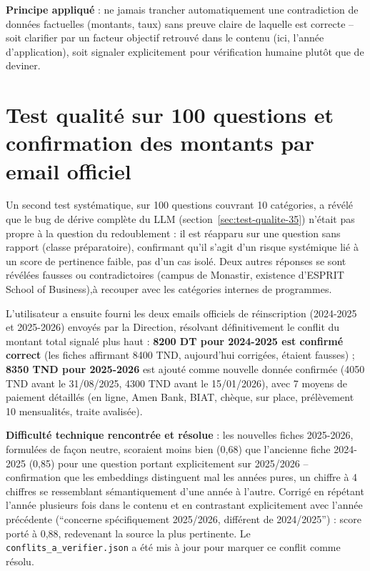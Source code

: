 \documentclass[11pt,a4paper]{report}
\begin{document}
\begin{noteinfo}
\textbf{Principe appliqué} : ne jamais trancher automatiquement une contradiction de
données factuelles (montants, taux) sans preuve claire de laquelle est correcte --
soit clarifier par un facteur objectif retrouvé dans le contenu (ici, l'année
d'application), soit signaler explicitement pour vérification humaine plutôt que de
deviner.
\end{noteinfo}

\section{Test qualité sur 100 questions et confirmation des montants par email officiel}
Un second test systématique, sur 100 questions couvrant 10 catégories, a révélé que le
bug de dérive complète du LLM (section~\ref{sec:test-qualite-35}) n'était pas propre à
la question du redoublement : il est réapparu sur une question sans rapport (classe
préparatoire), confirmant qu'il s'agit d'un risque systémique lié à un score de
pertinence faible, pas d'un cas isolé. Deux autres réponses se sont révélées fausses ou
contradictoires (campus de Monastir, existence d'ESPRIT School of Business),à recouper
avec les catégories internes de programmes.

L'utilisateur a ensuite fourni les deux emails officiels de réinscription (2024-2025 et
2025-2026) envoyés par la Direction, résolvant définitivement le conflit du montant
total signalé plus haut : \textbf{8200 DT pour 2024-2025 est confirmé correct} (les
fiches affirmant 8400 TND, aujourd'hui corrigées, étaient fausses) ; \textbf{8350 TND
pour 2025-2026} est ajouté comme nouvelle donnée confirmée (4050 TND avant le
31/08/2025, 4300 TND avant le 15/01/2026), avec 7 moyens de paiement détaillés (en
ligne, Amen Bank, BIAT, chèque, sur place, prélèvement 10 mensualités, traite avalisée).

\textbf{Difficulté technique rencontrée et résolue} : les nouvelles fiches 2025-2026,
formulées de façon neutre, scoraient moins bien (0,68) que l'ancienne fiche 2024-2025
(0,85) pour une question portant explicitement sur 2025/2026 -- confirmation que les
embeddings distinguent mal les années pures, un chiffre à 4 chiffres se ressemblant
sémantiquement d'une année à l'autre. Corrigé en répétant l'année plusieurs fois dans le
contenu et en contrastant explicitement avec l'année précédente (``concerne
spécifiquement 2025/2026, différent de 2024/2025'') : score porté à 0,88, redevenant la
source la plus pertinente. Le \texttt{conflits\_a\_verifier.json} a été mis à jour pour
marquer ce conflit comme résolu.
\end{document}
